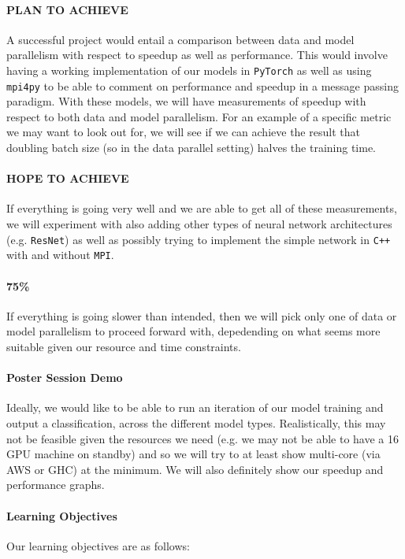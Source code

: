 \documentclass{article}
\begin{document}
\paragraph{PLAN TO ACHIEVE} A successful project would entail a comparison between data and model parallelism with respect to speedup as well as performance. This would involve having a working implementation of our models in \texttt{PyTorch} as well as using \texttt{mpi4py} to be able to comment on performance and speedup in a message passing paradigm. With these models, we will have measurements of speedup with respect to both data and model parallelism. For an example of a specific metric we may want to look out for, we will see if we can achieve the result that doubling batch size (so in the data parallel setting) halves the training time.

\paragraph{HOPE TO ACHIEVE} If everything is going very well and we are able to get all of these measurements, we will experiment with also adding other types of neural network architectures (e.g. \texttt{ResNet}) as well as possibly trying to implement the simple network in \texttt{C++} with and without \texttt{MPI}.

\paragraph{75\%} If everything is going slower than intended, then we will pick only one of data or model parallelism to proceed forward with, depedending on what seems more suitable given our resource and time constraints.

\paragraph{Poster Session Demo} Ideally, we would like to be able to run an iteration of our model training and output a classification, across the different model types. Realistically, this may not be feasible given the resources we need (e.g. we may not be able to have a 16 GPU machine on standby) and so we will try to at least show multi-core (via AWS or GHC) at the minimum. We will also definitely show our speedup and performance graphs.

\paragraph{Learning Objectives} Our learning objectives are as follows:
\end{document}
